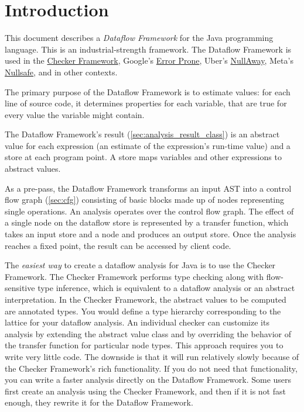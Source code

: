 

\section{Introduction}

This document describes a \emph{Dataflow Framework} for the Java
programming language.  This is an industrial-strength framework.
The Dataflow Framework is used in the
\href{https://eisop.github.io/}{Checker Framework},
Google's \href{http://errorprone.info/}{Error Prone},
Uber's \href{https://github.com/uber/NullAway}{NullAway},
Meta's \href{https://engineering.fb.com/2022/11/22/developer-tools/meta-java-nullsafe/}{Nullsafe},
and in other contexts.

The primary purpose of the Dataflow Framework is to estimate values:
for each line of source code, it determines properties for
each variable, that are true for every value the variable might contain.

The Dataflow Framework's result (\autoref{sec:analysis_result_class})
is an abstract value for each expression (an estimate of the
expression's run-time value) and a store at each program point.  A
store maps variables and other expressions to abstract
values.

As a pre-pass, the Dataflow Framework transforms an input
AST into a control flow graph (\autoref{sec:cfg}) consisting of basic
blocks made up of nodes representing single operations.  An analysis
operates over the control flow graph.  The effect of a single node on
the dataflow store is represented by a transfer function, which takes
an input store and a node and produces an output store.  Once the
analysis reaches a fixed point, the result can be accessed by client
code.

The \emph{easiest way} to create a dataflow analysis for Java is to use the
Checker Framework.  The Checker Framework performs type checking along with
flow-sensitive type inference, which is equivalent to a dataflow analysis or
an abstract interpretation.
In the Checker Framework, the abstract values to be computed are
annotated types.  You would define a type hierarchy corresponding to the
lattice for your dataflow analysis.
An individual checker can customize its analysis by
extending the abstract value class and by overriding the behavior of
the transfer function for particular node types.
This approach requires you to write very little code.  The downside is
that it will run relatively slowly because of the Checker Framework's rich
functionality.  If you do not need that functionality, you can write a
faster analysis directly on the Dataflow Framework.  Some users first
create an analysis using the Checker Framework, and then if it is not fast
enough, they rewrite it for the Dataflow Framework.

